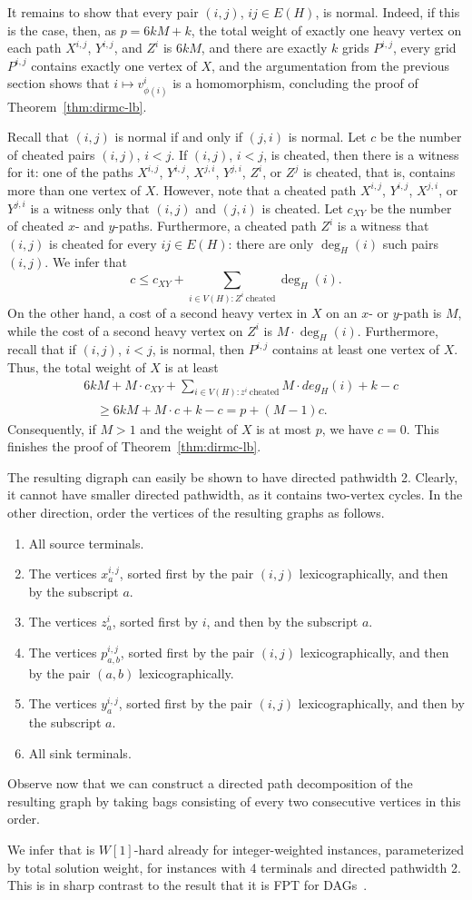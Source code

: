 It remains to show that every pair $(i,j)$, $ij \in E(H)$, is normal.
Indeed, if this is the case, then, as $p = 6kM + k$,
the total weight of exactly one heavy vertex on each path $X^{i,j}$, $Y^{i,j}$, and $Z^i$ is $6kM$,
and there are exactly $k$ grids $P^{i,j}$, every grid $P^{i,j}$ contains
exactly one vertex of $X$, and the argumentation from the previous section
shows that $i \mapsto v^i_{\phi(i)}$ is a homomorphism, concluding
the proof of Theorem~\ref{thm:dirmc-lb}.

Recall that $(i,j)$ is normal if and only if $(j,i)$ is normal.
Let $c$ be the number of cheated pairs $(i,j)$, $i < j$.
If $(i,j)$, $i < j$, is cheated, then there is a witness for it:
one of the paths $X^{i,j}$, $Y^{i,j}$, $X^{j,i}$, $Y^{j,i}$,
$Z^i$, or $Z^j$ is cheated, that is, contains more than one vertex of $X$.
However, note that a cheated path $X^{i,j}$, $Y^{i,j}$, $X^{j,i}$, or $Y^{j,i}$ is a witness only that $(i,j)$ and $(j,i)$ is cheated.
Let $c_{XY}$ be the number of cheated $x$- and $y$-paths.
Furthermore, a cheated path $Z^i$ is a witness that $(i,j)$ is cheated
for every $ij \in E(H)$: there are only $\deg_H(i)$ such pairs $(i,j)$.
We infer that
$$c \leq c_{XY} + \sum_{i \in V(H): Z^i\ \textrm{cheated}} \deg_H(i).$$
On the other hand, 
a cost of a second heavy vertex in $X$ on an $x$- or $y$-path is $M$,
while the cost of a second heavy vertex on $Z^i$ is $M \cdot \deg_H(i)$.
Furthermore, recall that if $(i,j)$, $i < j$, is normal, then $P^{i,j}$ contains at least one vertex of $X$.
Thus, the total weight of $X$ is at least
\begin{align*}
& 6kM + M\cdot c_{XY} + \sum_{i \in V(H): z^i\ \textrm{cheated}} M \cdot deg_H(i) + k - c \\
&\quad \geq 6kM + M\cdot c + k - c = p + (M-1)c.
\end{align*}
Consequently, if $M > 1$ and the weight of $X$ is at most $p$, we have $c=0$.
This finishes the proof of Theorem~\ref{thm:dirmc-lb}.

The resulting digraph can easily be shown to have directed pathwidth 2.
Clearly, it cannot have smaller directed pathwidth, as it contains two-vertex
cycles.
In the other direction, order the vertices of the resulting graphs as follows.
\begin{enumerate}
\item All source terminals.
\item The vertices $x^{i,j}_a$, sorted first by the pair $(i,j)$ lexicographically, and then by the subscript $a$.
\item The vertices $z^i_a$, sorted first by $i$, and then by the subscript $a$.
\item The vertices $p^{i,j}_{a,b}$, sorted first by the pair $(i,j)$ lexicographically, and then by the pair $(a,b)$ lexicographically.
\item The vertices $y^{i,j}_a$, sorted first by the pair $(i,j)$ lexicographically, and then by the subscript $a$.
\item All sink terminals.
\end{enumerate}
Observe now that we can 
construct a directed path decomposition of the resulting graph
by taking bags consisting of every two consecutive vertices in this order.

We infer that \dirmc{} is $W[1]$-hard already for integer-weighted instances,
parameterized by total solution weight, for instances with 4 terminals 
and directed pathwidth 2. This is in sharp contrast to the result
that it is FPT for DAGs~\cite{dags-alg}.
